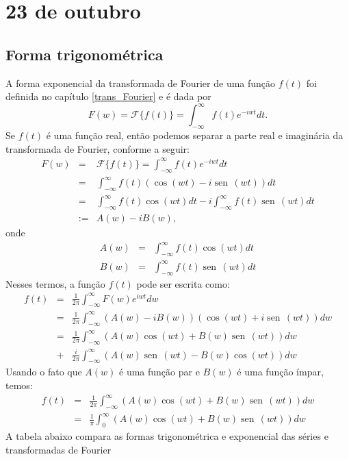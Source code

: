 \documentclass[a4paper,10pt]{book}
\newcommand{\sen}{\operatorname{sen}\,}
\begin{document}
 \chapter{23 de outubro}
  \section{Forma trigonométrica}
 A forma exponencial da transformada de Fourier de uma função $f(t)$ foi definida no capítulo \ref{trans_Fourier} e é dada por
 \begin{equation}
 F(w)=\mathcal{F}\{f(t)\}=\int_{-\infty}^\infty f(t)e^{-iwt}dt.
 \end{equation}
 Se $f(t)$ é uma função real, então podemos separar a parte real e imaginária da transformada de Fourier, conforme a seguir:
 \begin{eqnarray*}
 F(w)&=&\mathcal{F}\{f(t)\}=\int_{-\infty}^\infty f(t)e^{-iwt}dt\\
 &=&\int_{-\infty}^\infty f(t)\left(\cos(wt)-i\sen(wt)\right)dt\\
 &=&\int_{-\infty}^\infty f(t)\cos(wt)dt-i\int_{-\infty}^\infty f(t)\sen(wt) dt\\
 &:=&A(w)-iB(w),
 \end{eqnarray*}
 onde
 \begin{eqnarray*}
 A(w)&=&\int_{-\infty}^\infty f(t)\cos(wt)dt\\
 B(w)&=&\int_{-\infty}^\infty f(t)\sen(wt) dt
 \end{eqnarray*}
 Nesses termos, a função $f(t)$ pode ser escrita como:
 \begin{eqnarray*}
 f(t)&=&\frac{1}{2\pi}\int_{-\infty}^\infty F(w)e^{iwt}dw\\
 &=&\frac{1}{2\pi}\int_{-\infty}^\infty \left(A(w)-i B(w)\right)\left(\cos(wt)+i\sen(wt)\right)dw\\
 &=&\frac{1}{2\pi}\int_{-\infty}^\infty\left( A(w)\cos(wt)+ B(w)\sen(wt)\right)dw\\&+&\frac{i}{2\pi}\int_{-\infty}^\infty \left(A(w)\sen(wt)- B(w)\cos(wt)\right)dw
 \end{eqnarray*}
 Usando o fato que $A(w)$ é uma função par e $B(w)$ é uma função ímpar, temos:
 \begin{eqnarray*}
 f(t)&=&\frac{1}{2\pi}\int_{-\infty}^\infty\left(A(w)\cos(wt)+ B(w)\sen(wt)\right)dw\\
 &=&\frac{1}{\pi}\int_{0}^\infty\left( A(w)\cos(wt)+ B(w)\sen(wt)\right)dw
 \end{eqnarray*}
 A tabela abaixo compara as formas trigonométrica e exponencial das séries e transformadas de Fourier
\end{document}
